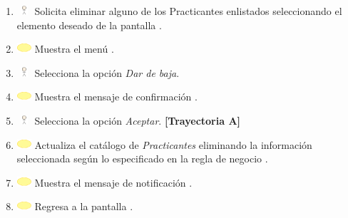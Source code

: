 \begin{enumerate}
	\item \includegraphics[width=15pt, height=10pt]{./Figuras/iconosCU/usuario.png} Solicita eliminar alguno de los Practicantes enlistados seleccionando el elemento deseado de la pantalla .
	\item \includegraphics[width=15pt]{./Figuras/iconosCU/herramienta.png} Muestra el menú .
	\item \includegraphics[width=15pt, height=10pt]{./Figuras/iconosCU/usuario.png} Selecciona la opción \textit{Dar de baja}.
	\item \includegraphics[width=15pt]{./Figuras/iconosCU/herramienta.png} Muestra el mensaje de confirmación .
	\item \includegraphics[width=15pt, height=10pt]{./Figuras/iconosCU/usuario.png} Selecciona la opción \textit{Aceptar}. \textbf{[Trayectoria A]}
	\item \includegraphics[width=15pt]{./Figuras/iconosCU/herramienta.png} Actualiza el catálogo de \textit{Practicantes} eliminando la información seleccionada según lo especificado en la regla de negocio .
	\item \includegraphics[width=15pt]{./Figuras/iconosCU/herramienta.png} Muestra el mensaje de notificación .
	\item \includegraphics[width=15pt]{./Figuras/iconosCU/herramienta.png} Regresa a la pantalla .
\end{enumerate}
	
